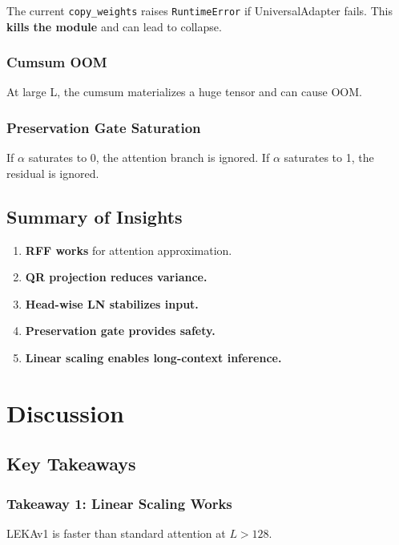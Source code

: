 The current \texttt{copy\_weights} raises \texttt{RuntimeError} if UniversalAdapter fails. 
This \textbf{kills the module} and can lead to collapse.

\subsubsection{Cumsum OOM}

At large L, the cumsum materializes a huge tensor and can cause OOM.

\subsubsection{Preservation Gate Saturation}

If $\alpha$ saturates to 0, the attention branch is ignored. If $\alpha$ saturates to 1, 
the residual is ignored.

\subsection{Summary of Insights}

\begin{enumerate}
\item \textbf{RFF works} for attention approximation.
\item \textbf{QR projection reduces variance.}
\item \textbf{Head-wise LN stabilizes input.}
\item \textbf{Preservation gate provides safety.}
\item \textbf{Linear scaling enables long-context inference.}

\end{enumerate}


\section{Discussion}

\subsection{Key Takeaways}

\subsubsection{Takeaway 1: Linear Scaling Works}

LEKAv1 is faster than standard attention at $L > 128$.

